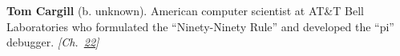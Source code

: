 \textbf{Tom Cargill} (b. unknown). American computer scientist at AT\&T Bell Laboratories who formulated the ``Ninety-Ninety Rule'' and developed the ``pi'' debugger. \emph{[Ch.~\hyperref[ch:minecraftcreeper]{22}]}

